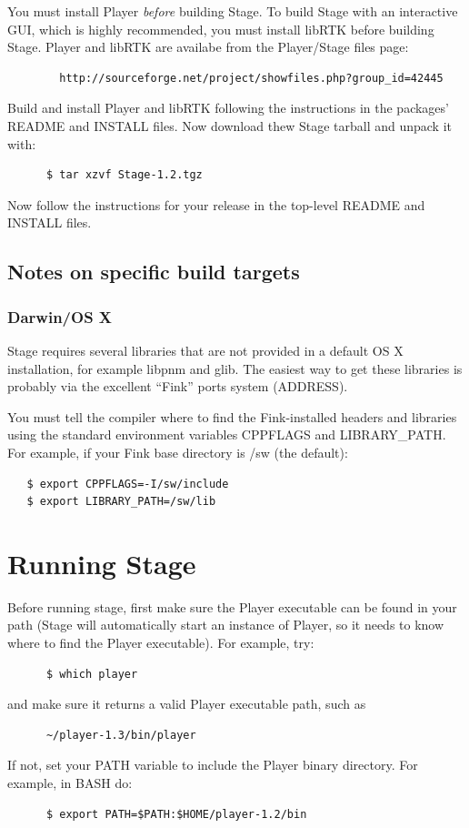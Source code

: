 \documentclass[11pt,twoside]{report}
\begin{document}
  You must install Player {\em before} building Stage. To build Stage
 with an interactive GUI, which is highly recommended, you must
 install libRTK before building Stage. Player and libRTK are availabe
 from the Player/Stage files page:
        \begin{verbatim}
        http://sourceforge.net/project/showfiles.php?group_id=42445
       \end{verbatim}
        \noindent Build and install Player and libRTK following the
        instructions in the packages' README and INSTALL files. Now
        download thew Stage tarball and unpack it with:
      \begin{verbatim}
      $ tar xzvf Stage-1.2.tgz
      \end{verbatim}
   \noindent Now follow the instructions for your release in the
    top-level README and INSTALL files.

    \subsection{Notes on specific build targets}
\subsubsection{Darwin/OS X}
Stage requires several libraries that are not provided in a default OS
X installation, for example libpnm and glib. The easiest way to get
these libraries is probably via the excellent ``Fink'' ports system
(ADDRESS).

You must tell the compiler where to find the Fink-installed headers
and libraries using the standard environment variables CPPFLAGS and
LIBRARY_PATH. For example, if your Fink base directory is /sw (the
default):

\begin{verbatim}
   $ export CPPFLAGS=-I/sw/include
   $ export LIBRARY_PATH=/sw/lib
\end{verbatim}

  \section{Running Stage}

    Before running stage, first make sure the Player executable can be
    found in your path (Stage will automatically start an instance of
    Player, so it needs to know where to find the Player executable).
    For example, try:
      \begin{verbatim}
      $ which player
      \end{verbatim}
    and make sure it returns a valid Player executable path, such as
      \begin{verbatim}
      ~/player-1.3/bin/player
      \end{verbatim}
    If not, set your PATH variable to include the Player binary directory. 
    For example, in BASH do:
      \begin{verbatim}  
      $ export PATH=$PATH:$HOME/player-1.2/bin
      \end{verbatim}  
\end{document}
